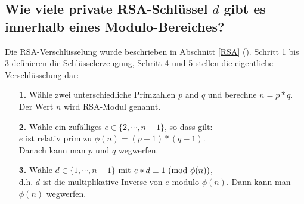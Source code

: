 \begin{refsegment}
\newpage
\hypertarget{NumberTheory_Sage_Number-of-RSA-keys}{}
\subsection[Wie viele private RSA-Schlüssel d gibt es innerhalb eines Modulo-Bereiches?]
{Wie viele private RSA-Schlüs\discretionary{-}{}{}sel $d$ gibt es innerhalb eines Modulo-Be\-rei\-ches?}

\label{l:NumberTheory_Sage_Number-of-RSA-keys}{}

Die RSA-Verschlüsselung wurde beschrieben in Abschnitt \ref{RSA} (\glqq {}\grqq).
Schritt 1 bis 3 definieren die Schlüsselerzeugung, Schritt 4 und 5 stellen die
eigentliche Verschlüsselung dar:
\begin{itemize}
  \item[{\bf 1.}] Wähle zwei unterschiedliche Primzahlen $p$ and $q$
                  und berechne $n = p*q$.\\
                  Der Wert $n$ wird RSA-Modul genannt.

  \item[{\bf 2.}] Wähle ein zufälliges $e \in \{2, \cdots, n-1\}$, so dass gilt:\\
                  $e$ ist relativ prim
                  zu $\phi(n) = (p-1)*(q-1)$.\\
                  Danach kann man $p$ und $q$ \glqq wegwerfen\grqq.

  \item[{\bf 3.}] Wähle $d \in \{1, \cdots, n-1\}$ mit $e*d \equiv 1
                  {\rm ~(mod~} \phi(n))$,\\
		  d.h. $d$ ist die multiplikative Inverse von $e$ modulo $\phi(n)$.
		  Dann kann man $\phi(n)$ \glqq wegwerfen\grqq.


\end{itemize}
\end{refsegment}
